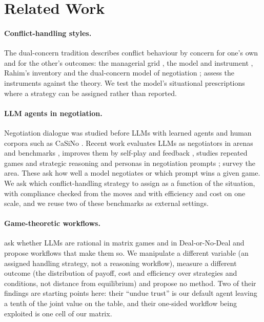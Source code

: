 \section{Related Work}
\label{sec:related}

\paragraph{Conflict-handling styles.} The dual-concern tradition describes conflict behaviour by concern for one's own and for the other's outcomes: the managerial grid \citep{blake1964managerial}, the \tki{} model and instrument \citep{thomas1974tki,thomas1992conflict}, Rahim's inventory \citep{rahim1983measure} and the dual-concern model of negotiation \citep{pruitt1986social}; \citet{vandevliert1990toward} assess the instruments against the theory. We test the model's situational prescriptions \citep{thomas1977toward} where a strategy can be assigned rather than reported.

\paragraph{LLM agents in negotiation.} Negotiation dialogue was studied before LLMs with learned agents \citep{lewis2017deal,he2018decoupling} and human corpora such as CaSiNo \citep{chawla2021casino}. Recent work evaluates LLMs as negotiators in arenas and benchmarks \citep{bianchi2024negotiationarena,abdelnabi2024cooperation,xia2024measuring,kwon2024effective,davidson2024evaluating}, improves them by self-play and feedback \citep{fu2023improving}, studies repeated games and strategic reasoning \citep{akata2023playing,gandhi2023strategic} and personas in negotiation prompts \citep{noh2024llms}; \citet{zhan2024negotiate} survey the area. These ask how well a model negotiates or which prompt wins a given game. We ask which conflict-handling strategy to assign as a function of the situation, with compliance checked from the moves and with efficiency and cost on one scale, and we reuse two of these benchmarks as external settings.

\paragraph{Game-theoretic workflows.} \citet{hua2024gametheoretic} ask whether LLMs are rational in matrix games and in Deal-or-No-Deal and propose workflows that make them so. We manipulate a different variable (an assigned handling strategy, not a reasoning workflow), measure a different outcome (the distribution of payoff, cost and efficiency over strategies and conditions, not distance from equilibrium) and propose no method. Two of their findings are starting points here: their ``undue trust'' is our default agent leaving a tenth of the joint value on the table, and their one-sided workflow being exploited is one cell of our matrix.

